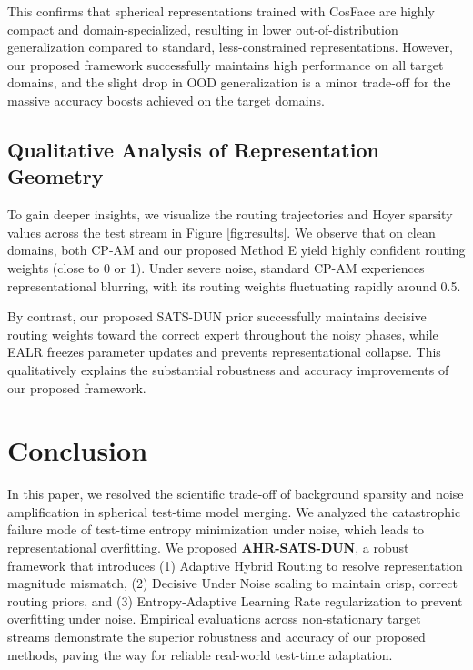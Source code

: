 \documentclass{article}
\theoremstyle{plain}
\theoremstyle{definition}
\theoremstyle{remark}
\begin{document}
This confirms that spherical representations trained with CosFace are highly compact and domain-specialized, resulting in lower out-of-distribution generalization compared to standard, less-constrained representations. However, our proposed framework successfully maintains high performance on all target domains, and the slight drop in OOD generalization is a minor trade-off for the massive accuracy boosts achieved on the target domains.

\subsection{Qualitative Analysis of Representation Geometry}
To gain deeper insights, we visualize the routing trajectories and Hoyer sparsity values across the test stream in Figure \ref{fig:results}. We observe that on clean domains, both CP-AM and our proposed Method E yield highly confident routing weights (close to 0 or 1). Under severe noise, standard CP-AM experiences representational blurring, with its routing weights fluctuating rapidly around 0.5. 

By contrast, our proposed SATS-DUN prior successfully maintains decisive routing weights toward the correct expert throughout the noisy phases, while EALR freezes parameter updates and prevents representational collapse. This qualitatively explains the substantial robustness and accuracy improvements of our proposed framework.

\section{Conclusion}
In this paper, we resolved the scientific trade-off of background sparsity and noise amplification in spherical test-time model merging. We analyzed the catastrophic failure mode of test-time entropy minimization under noise, which leads to representational overfitting. We proposed \textbf{AHR-SATS-DUN}, a robust framework that introduces (1) Adaptive Hybrid Routing to resolve representation magnitude mismatch, (2) Decisive Under Noise scaling to maintain crisp, correct routing priors, and (3) Entropy-Adaptive Learning Rate regularization to prevent overfitting under noise. Empirical evaluations across non-stationary target streams demonstrate the superior robustness and accuracy of our proposed methods, paving the way for reliable real-world test-time adaptation.



\end{document}
